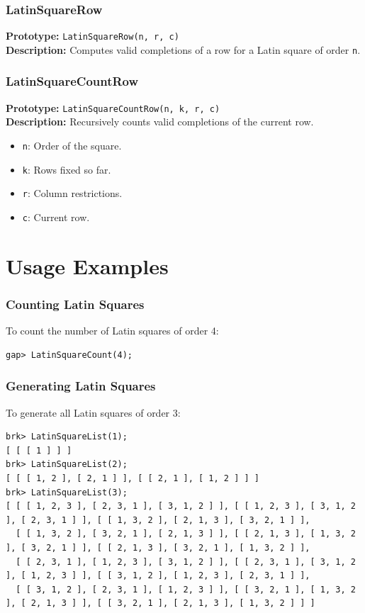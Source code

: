 \documentclass{beamer}
\begin{document}
\begin{frame}[fragile]
\frametitle{LatinSquareRow}
\textbf{Prototype:} \texttt{LatinSquareRow(n, r, c)}\\
\textbf{Description:} Computes valid completions of a row for a Latin square of order \texttt{n}.
\end{frame}

\begin{frame}[fragile]
\frametitle{LatinSquareCountRow}
\textbf{Prototype:} \texttt{LatinSquareCountRow(n, k, r, c)}\\
\textbf{Description:} Recursively counts valid completions of the current row.
\begin{itemize}
  \item \texttt{n}: Order of the square.
  \item \texttt{k}: Rows fixed so far.
  \item \texttt{r}: Column restrictions.
  \item \texttt{c}: Current row.
\end{itemize}
\end{frame}

\section{Usage Examples}
\begin{frame}[fragile]
\frametitle{Counting Latin Squares}
To count the number of Latin squares of order 4:
\begin{lstlisting}
gap> LatinSquareCount(4);
\end{lstlisting}
\end{frame}

\begin{frame}[fragile]
\frametitle{Generating Latin Squares}
To generate all Latin squares of order 3:
\begin{lstlisting}
brk> LatinSquareList(1);
[ [ [ 1 ] ] ]
brk> LatinSquareList(2);
[ [ [ 1, 2 ], [ 2, 1 ] ], [ [ 2, 1 ], [ 1, 2 ] ] ]
brk> LatinSquareList(3);
[ [ [ 1, 2, 3 ], [ 2, 3, 1 ], [ 3, 1, 2 ] ], [ [ 1, 2, 3 ], [ 3, 1, 2 ], [ 2, 3, 1 ] ], [ [ 1, 3, 2 ], [ 2, 1, 3 ], [ 3, 2, 1 ] ],
  [ [ 1, 3, 2 ], [ 3, 2, 1 ], [ 2, 1, 3 ] ], [ [ 2, 1, 3 ], [ 1, 3, 2 ], [ 3, 2, 1 ] ], [ [ 2, 1, 3 ], [ 3, 2, 1 ], [ 1, 3, 2 ] ],
  [ [ 2, 3, 1 ], [ 1, 2, 3 ], [ 3, 1, 2 ] ], [ [ 2, 3, 1 ], [ 3, 1, 2 ], [ 1, 2, 3 ] ], [ [ 3, 1, 2 ], [ 1, 2, 3 ], [ 2, 3, 1 ] ],
  [ [ 3, 1, 2 ], [ 2, 3, 1 ], [ 1, 2, 3 ] ], [ [ 3, 2, 1 ], [ 1, 3, 2 ], [ 2, 1, 3 ] ], [ [ 3, 2, 1 ], [ 2, 1, 3 ], [ 1, 3, 2 ] ] ]
\end{lstlisting}
\end{frame}
\end{document}
